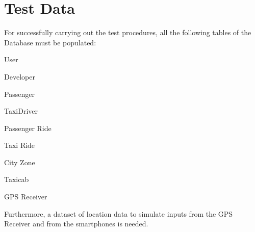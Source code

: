 \section{Test Data}
For successfully carrying out the test procedures, all the following tables of the Database must be populated:
\begin{itemize*}
	\item User
	\item Developer
	\item Passenger
	\item TaxiDriver
	\item Passenger Ride
	\item Taxi Ride
	\item City Zone
	\item Taxicab
	\item GPS Receiver
\end{itemize*}
Furthermore, a dataset of location data to simulate inputs from the GPS Receiver  and from the smartphones is needed.
	